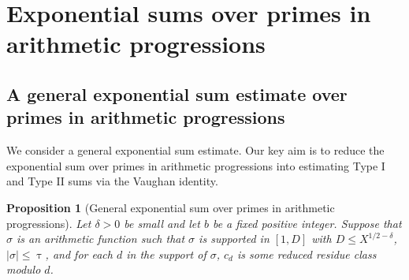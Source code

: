\documentclass[12pt]{amsart}
\numberwithin{equation}{section}
\newtheorem{prop}[theorem]{Proposition}
\theoremstyle{remark}
\theoremstyle{definition}
\begin{document}
\section{Exponential sums over primes in arithmetic progressions}\label{sec: exponen}

\subsection{A general exponential sum estimate over primes in arithmetic progressions}
We consider a general exponential sum estimate. Our key aim is to reduce the exponential sum over primes in arithmetic progressions into estimating Type I and Type II sums via the Vaughan identity.

\begin{prop}[General exponential sum over primes in arithmetic progressions]\label{ExpGen}
Let $\delta>0$ be small and let $b$ be a fixed positive integer. Suppose that $\sigma$ is an arithmetic function such that $\sigma$ is supported in $[1, D]$ with $D\leq X^{1/2-\delta}$, $|\sigma|\leq \uptau$, and for each $d$ in the support of $\sigma$, $c_d$ is some reduced residue class modulo $d$.


\end{prop}
\end{document}
